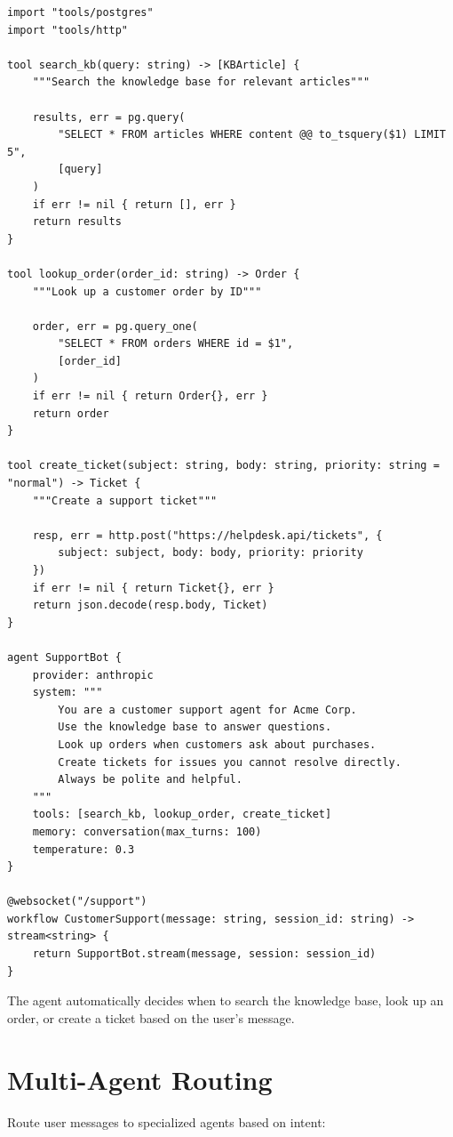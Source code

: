 \begin{lstlisting}
import "tools/postgres"
import "tools/http"

tool search_kb(query: string) -> [KBArticle] {
    """Search the knowledge base for relevant articles"""

    results, err = pg.query(
        "SELECT * FROM articles WHERE content @@ to_tsquery($1) LIMIT 5",
        [query]
    )
    if err != nil { return [], err }
    return results
}

tool lookup_order(order_id: string) -> Order {
    """Look up a customer order by ID"""

    order, err = pg.query_one(
        "SELECT * FROM orders WHERE id = $1",
        [order_id]
    )
    if err != nil { return Order{}, err }
    return order
}

tool create_ticket(subject: string, body: string, priority: string = "normal") -> Ticket {
    """Create a support ticket"""

    resp, err = http.post("https://helpdesk.api/tickets", {
        subject: subject, body: body, priority: priority
    })
    if err != nil { return Ticket{}, err }
    return json.decode(resp.body, Ticket)
}

agent SupportBot {
    provider: anthropic
    system: """
        You are a customer support agent for Acme Corp.
        Use the knowledge base to answer questions.
        Look up orders when customers ask about purchases.
        Create tickets for issues you cannot resolve directly.
        Always be polite and helpful.
    """
    tools: [search_kb, lookup_order, create_ticket]
    memory: conversation(max_turns: 100)
    temperature: 0.3
}

@websocket("/support")
workflow CustomerSupport(message: string, session_id: string) -> stream<string> {
    return SupportBot.stream(message, session: session_id)
}
\end{lstlisting}

The agent automatically decides when to search the knowledge base, look up an order, or create a ticket based on the user's message.

\section{Multi-Agent Routing}

Route user messages to specialized agents based on intent:

